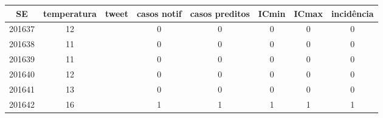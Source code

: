 \begin{tabular}{c|ccccccc}
  \hline
SE & temperatura & tweet & casos notif & casos preditos & ICmin & ICmax & incidência \\ 
  \hline
201637 & 12 &  & 0 & 0 & 0 & 0 & 0 \\ 
  201638 & 11 &  & 0 & 0 & 0 & 0 & 0 \\ 
  201639 & 11 &  & 0 & 0 & 0 & 0 & 0 \\ 
  201640 & 12 &  & 0 & 0 & 0 & 0 & 0 \\ 
  201641 & 13 &  & 0 & 0 & 0 & 0 & 0 \\ 
  201642 & 16 &  & 1 & 1 & 1 & 1 & 1 \\ 
   \hline
\end{tabular}
